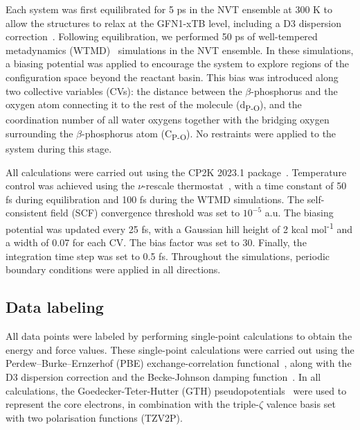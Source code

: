 Each system was first equilibrated for 5 ps in the NVT ensemble at 300 K to allow the structures to relax at the GFN1-xTB level, including a D3 dispersion correction~\citep{grimmeConsistentAccurateInitio2010}. Following equilibration, we performed 50 ps of well-tempered metadynamics (WTMD)~\citep{barducciWellTemperedMetadynamicsSmoothly2008} simulations in the NVT ensemble. In these simulations, a biasing potential was applied to encourage the system to explore regions of the configuration space beyond the reactant basin. This bias was introduced along two collective variables (CVs): the distance between the $\beta$-phosphorus and the oxygen atom connecting it to the rest of the molecule (d\textsubscript{P-O}), and the coordination number of all water oxygens together with the bridging oxygen surrounding the $\beta$-phosphorus atom (C\textsubscript{P-O}). No restraints were applied to the system during this stage.

All calculations were carried out using the CP2K 2023.1 package~\citep{kuhneCP2KElectronicStructure2020}. Temperature control was achieved using the $\nu$-rescale thermostat~\citep{bussiCanonicalSamplingVelocity2007}, with a time constant of 50 fs during equilibration and 100 fs during the WTMD simulations. The self-consistent field (SCF) convergence threshold was set to $10^{-5}$ a.u. The biasing potential was updated every 25 fs, with a Gaussian hill height of 2 kcal mol\textsuperscript{-1} and a width of 0.07 for each CV. The bias factor was set to 30. Finally, the integration time step was set to 0.5 fs. Throughout the simulations, periodic boundary conditions were applied in all directions.



\subsection{Data labeling}
All data points were labeled by performing single-point calculations to obtain the energy and force values. These single-point calculations were carried out using the Perdew–Burke–Ernzerhof (PBE) exchange-correlation functional~\citep{perdewGeneralizedGradientApproximation1996}, along with the D3 dispersion correction and the Becke-Johnson damping function~\citep{grimmeConsistentAccurateInitio2010,grimmeEffectDampingFunction2011}. In all calculations, the Goedecker-Teter-Hutter (GTH) pseudopotentials~\citep{goedeckerSeparableDualspaceGaussian1996,hartwigsenRelativisticSeparableDualspace1998} were used to represent the core electrons, in combination with the triple-$\zeta$ valence basis set with two polarisation functions (TZV2P).

